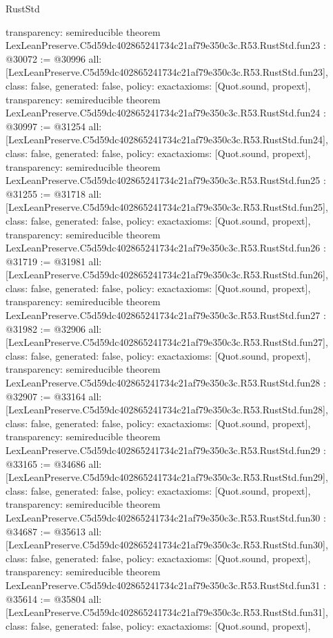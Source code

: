 \begin{lexlean}{RustStd}
\begin{coremodule}
{  transparency: semireducible
}
theorem LexLeanPreserve.C5d59dc402865241734c21af79e350c3c.R53.RustStd.fun23 : @30072 := @30996 {
  all: [LexLeanPreserve.C5d59dc402865241734c21af79e350c3c.R53.RustStd.fun23],
  class: false,
  generated: false,
  policy: exact{axioms: [Quot.sound, propext]},
  transparency: semireducible
}
theorem LexLeanPreserve.C5d59dc402865241734c21af79e350c3c.R53.RustStd.fun24 : @30997 := @31254 {
  all: [LexLeanPreserve.C5d59dc402865241734c21af79e350c3c.R53.RustStd.fun24],
  class: false,
  generated: false,
  policy: exact{axioms: [Quot.sound, propext]},
  transparency: semireducible
}
theorem LexLeanPreserve.C5d59dc402865241734c21af79e350c3c.R53.RustStd.fun25 : @31255 := @31718 {
  all: [LexLeanPreserve.C5d59dc402865241734c21af79e350c3c.R53.RustStd.fun25],
  class: false,
  generated: false,
  policy: exact{axioms: [Quot.sound, propext]},
  transparency: semireducible
}
theorem LexLeanPreserve.C5d59dc402865241734c21af79e350c3c.R53.RustStd.fun26 : @31719 := @31981 {
  all: [LexLeanPreserve.C5d59dc402865241734c21af79e350c3c.R53.RustStd.fun26],
  class: false,
  generated: false,
  policy: exact{axioms: [Quot.sound, propext]},
  transparency: semireducible
}
theorem LexLeanPreserve.C5d59dc402865241734c21af79e350c3c.R53.RustStd.fun27 : @31982 := @32906 {
  all: [LexLeanPreserve.C5d59dc402865241734c21af79e350c3c.R53.RustStd.fun27],
  class: false,
  generated: false,
  policy: exact{axioms: [Quot.sound, propext]},
  transparency: semireducible
}
theorem LexLeanPreserve.C5d59dc402865241734c21af79e350c3c.R53.RustStd.fun28 : @32907 := @33164 {
  all: [LexLeanPreserve.C5d59dc402865241734c21af79e350c3c.R53.RustStd.fun28],
  class: false,
  generated: false,
  policy: exact{axioms: [Quot.sound, propext]},
  transparency: semireducible
}
theorem LexLeanPreserve.C5d59dc402865241734c21af79e350c3c.R53.RustStd.fun29 : @33165 := @34686 {
  all: [LexLeanPreserve.C5d59dc402865241734c21af79e350c3c.R53.RustStd.fun29],
  class: false,
  generated: false,
  policy: exact{axioms: [Quot.sound, propext]},
  transparency: semireducible
}
theorem LexLeanPreserve.C5d59dc402865241734c21af79e350c3c.R53.RustStd.fun30 : @34687 := @35613 {
  all: [LexLeanPreserve.C5d59dc402865241734c21af79e350c3c.R53.RustStd.fun30],
  class: false,
  generated: false,
  policy: exact{axioms: [Quot.sound, propext]},
  transparency: semireducible
}
theorem LexLeanPreserve.C5d59dc402865241734c21af79e350c3c.R53.RustStd.fun31 : @35614 := @35804 {
  all: [LexLeanPreserve.C5d59dc402865241734c21af79e350c3c.R53.RustStd.fun31],
  class: false,
  generated: false,
  policy: exact{axioms: [Quot.sound, propext]},
}
\end{coremodule}
\end{lexlean}
